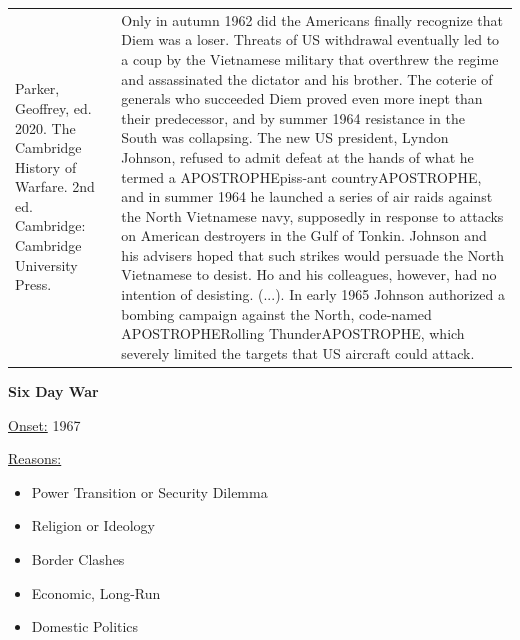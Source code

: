 {\begin{longtable}{p{}p{}}
Parker, Geoffrey, ed. 2020. The Cambridge History of Warfare. 2nd ed. Cambridge: Cambridge University Press. & Only in autumn 1962 did the Americans finally recognize that Diem was a loser. Threats of US withdrawal eventually led to a coup by the Vietnamese military that overthrew the regime and assassinated the dictator and his brother. The coterie of generals who succeeded Diem proved even more inept than their predecessor, and by summer 1964 resistance in the South was collapsing. The new US president, Lyndon Johnson, refused to admit defeat at the hands of what he termed a APOSTROPHEpiss-ant countryAPOSTROPHE, and in summer 1964 he launched a series of air raids against the North Vietnamese navy, supposedly in response to attacks on American destroyers in the Gulf of Tonkin. Johnson and his advisers hoped that such strikes would persuade the North Vietnamese to desist. Ho and his colleagues, however, had no intention of desisting. (...). In early 1965 Johnson authorized a bombing campaign against the North, code-named APOSTROPHERolling ThunderAPOSTROPHE, which severely limited the targets that US aircraft could attack.  
\\
\end{longtable}}
\clearpage
         \textbf{Six Day War} 

          \underline{Onset:} 1967         

\underline{Reasons:}
\begin{itemize}
\item Power Transition or Security Dilemma
\item Religion or Ideology
\item Border Clashes
\item Economic, Long-Run
\item Domestic Politics
\end{itemize}

